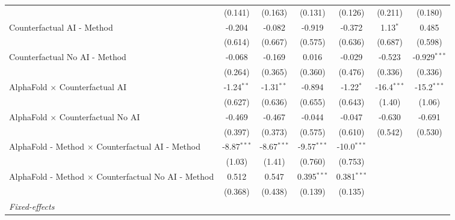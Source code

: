 \begin{tabular}{lcccccc}
                                                              & (0.141)       & (0.163)       & (0.131)       & (0.126)       & (0.211)       & (0.180)\\   
   Counterfactual AI - Method                                 & -0.204        & -0.082        & -0.919        & -0.372        & 1.13$^{*}$    & 0.485\\   
                                                              & (0.614)       & (0.667)       & (0.575)       & (0.636)       & (0.687)       & (0.598)\\   
   Counterfactual No AI - Method                              & -0.068        & -0.169        & 0.016         & -0.029        & -0.523        & -0.929$^{***}$\\   
                                                              & (0.264)       & (0.365)       & (0.360)       & (0.476)       & (0.336)       & (0.336)\\   
   AlphaFold $\times$ Counterfactual AI                       & -1.24$^{**}$  & -1.31$^{**}$  & -0.894        & -1.22$^{*}$   & -16.4$^{***}$ & -15.2$^{***}$\\   
                                                              & (0.627)       & (0.636)       & (0.655)       & (0.643)       & (1.40)        & (1.06)\\   
   AlphaFold $\times$ Counterfactual No AI                    & -0.469        & -0.467        & -0.044        & -0.047        & -0.630        & -0.691\\   
                                                              & (0.397)       & (0.373)       & (0.575)       & (0.610)       & (0.542)       & (0.530)\\   
   AlphaFold - Method $\times$ Counterfactual AI - Method     & -8.87$^{***}$ & -8.67$^{***}$ & -9.57$^{***}$ & -10.0$^{***}$ &               &   \\   
                                                              & (1.03)        & (1.41)        & (0.760)       & (0.753)       &               &   \\   
   AlphaFold - Method $\times$ Counterfactual No AI - Method  & 0.512         & 0.547         & 0.395$^{***}$ & 0.381$^{***}$ &               &   \\   
                                                              & (0.368)       & (0.438)       & (0.139)       & (0.135)       &               &   \\   
   \midrule
   \emph{Fixed-effects}\\

\end{tabular}
